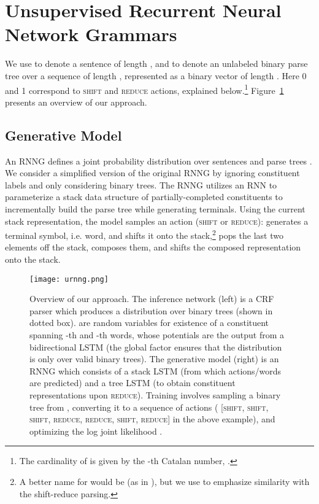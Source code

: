 \documentclass[11pt,a4paper]{article}
\begin{document}
\vspace{-2mm}
\section{Unsupervised Recurrent Neural Network Grammars}
\vspace{-2mm}

We use  to denote a sentence of length , and  to denote an unlabeled binary parse tree over a sequence of length , represented as a binary vector of length . Here 0 and 1 correspond to \textsc{shift} and \textsc{reduce} actions, explained below.\footnote{The cardinality of  is given by the -th Catalan number, . } Figure~\ref{fig:urnng} presents an overview of our approach.
\vspace{-1mm}
\subsection{Generative Model}
\vspace{-1mm}

An RNNG defines a joint probability distribution
 over sentences  and parse trees
. We consider a simplified version of the original RNNG
\cite{dyer2016rnng} by ignoring constituent labels and only
considering binary trees. The RNNG utilizes an RNN to parameterize a
stack data structure \cite{dyer2015stacklstm} of partially-completed
constituents to incrementally build the parse tree while generating
terminals. Using the current stack representation, the model samples
an action (\textsc{shift} or \textsc{reduce}): 
generates a terminal symbol, i.e. word, and shifts it onto the stack,\footnote{A
  better name for  would be  (as in
  \citet{dyer2016rnng}), but we use  to emphasize
  similarity with the shift-reduce parsing.}  pops
the last two elements off the stack, composes them, and shifts the
composed representation onto the stack.

\begin{figure}[t]
    \centering
    \texttt{[image: urnng.png]}
    \vspace{-6mm}
    \caption{Overview of our approach. The inference network  (left) is a CRF parser which produces a distribution over binary trees (shown in dotted box).  are random variables for existence of a constituent spanning -th and -th words, whose potentials are the output from a bidirectional LSTM (the global factor ensures that the distribution is only over valid binary trees).
    The generative model  (right) is an RNNG which consists of a stack LSTM (from which actions/words are predicted) and a tree LSTM (to obtain constituent representations upon \textsc{reduce}).
    Training involves sampling a binary tree from , converting it to a sequence of  actions ( [\textsc{shift}, \textsc{shift}, \textsc{shift}, \textsc{reduce}, \textsc{reduce}, \textsc{shift}, \textsc{reduce}] in the above example), and optimizing the log joint likelihood .}
    \label{fig:urnng}
    \vspace{-2mm}
\end{figure}
\end{document}
